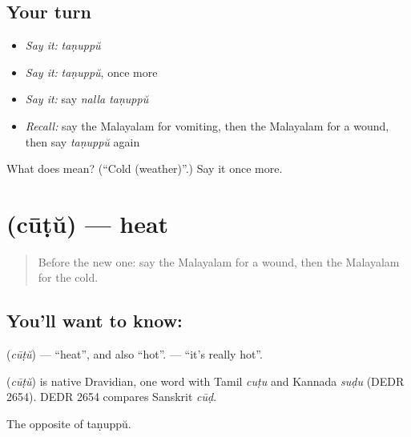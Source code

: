\subsection*{Your turn}
\begin{itemize}
\raggedright
  \item \emph{Say it:} \emph{taṇuppŭ}
  \item \emph{Say it:} \emph{taṇuppŭ}, once more
  \item \emph{Say it:} say \emph{nalla taṇuppŭ}
  \item \emph{Recall:} say the Malayalam for vomiting, then the Malayalam for a wound, then say \emph{taṇuppŭ} again
\end{itemize}

\begin{tcolorbox}[breakable,colback=teal!4,colframe=teal!35!black,title={Before you move on}]
What does  mean? (\textquotedblleft{}Cold (weather)\textquotedblright{}.) Say it once more.
\end{tcolorbox}
\section[\texorpdfstring{\ml{ചൂട്} (cūṭŭ)}{ചൂട് (cūṭŭ)}]{ (cūṭŭ) — heat}

\label{lesson:ML-C118-heat}



\begin{quote}
Before the new one: say the Malayalam for a wound, then the Malayalam for the cold.
\end{quote}

\subsection*{You'll want to know: }
\textbf{} (\emph{cūṭŭ}) — \textquotedblleft{}heat\textquotedblright{}, and also \textquotedblleft{}hot\textquotedblright{}. \textbf{ } — \textquotedblleft{}it's really hot\textquotedblright{}.

\begin{cousinweb}
\textbf{} (\emph{cūṭŭ}) is native Dravidian, one word with Tamil \emph{cuṭu} and Kannada \emph{suḍu} (DEDR 2654). DEDR 2654 compares Sanskrit \emph{cūḍ}.
\end{cousinweb}

\begin{grammarlens}[title={What you've built}]
The opposite of taṇuppŭ.
\end{grammarlens}

